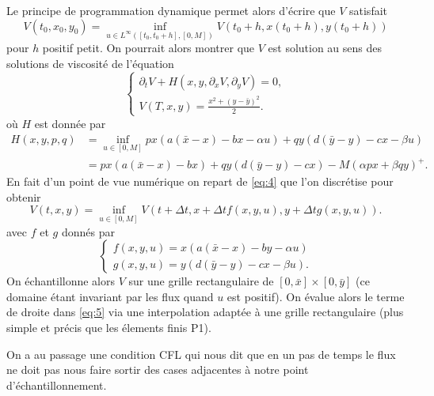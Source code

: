 \documentclass[a4paper,11pt,draft]{article}
\begin{document}
Le principe de programmation dynamique permet alors d'écrire que $V$ satisfait
\begin{equation}\label{eq:4}
    V(t_0,x_0,y_0) = \underset{u\in L^\infty([t_0,t_0+h],[0,M])}{\inf} V(t_0+h, x(t_0+h), y(t_0+h))
\end{equation}
pour $h$ positif petit.  On pourrait alors montrer que $V$ est solution au sens des solutions
de viscosité de l'équation
\begin{equation}
    \begin{cases}
        \partial_t V + H(x,y,\partial_x V, \partial_y V)=0,\\
        V(T,x,y)= \frac{x^2 + (y-\bar{y})^2}{2}.
    \end{cases}
\end{equation}
où $H$ est donnée par
\begin{align}
    H(x,y,p,q) & = \underset{u\in[0,M]}{\inf} p x (a (\bar{x} - x) - bx -\alpha u)
    + q y (d (\bar{y} - y) -c x - \beta u)\\
               & = p x (a (\bar{x} - x) - bx) + q y (d (\bar{y} - y) -c x ) - M (\alpha p x +
               \beta q y)^+.
\end{align}
En fait d'un point de vue numérique on repart de \eqref{eq:4} que l'on discrétise pour obtenir
\begin{equation}\label{eq:5}
    V(t, x, y) = \underset{u\in[0,M]}{\inf} V(t+\Delta t, x + \Delta t f(x,y,u), y + \Delta t
    g(x, y,u)).
\end{equation}
avec $f$ et $g$ donnés par
\begin{equation}
    \begin{cases}
        f(x,y,u) = x (a (\bar{x} - x) - b y - \alpha u)\\
        g(x,y,u) = y (d (\bar{y} - y) - c x - \beta u).
    \end{cases}
\end{equation}
On échantillonne alors $V$ sur une grille rectangulaire de $[0,\bar{x}] \times [0, \bar{y}]$
(ce domaine étant invariant par les flux quand $u$ est positif). On évalue alors le terme de
droite dans \eqref{eq:5} via une interpolation adaptée à une grille rectangulaire (plus simple
et précis que les élements finis P1).

On a au passage une condition CFL qui nous dit que en un pas de temps le flux ne doit pas nous
faire sortir des cases adjacentes à notre point d'échantillonnement.
\end{document}
